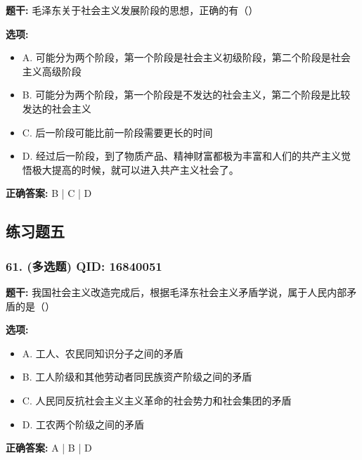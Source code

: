 \documentclass[12pt,UTF8]{ctexart}
\begin{document}
\textbf{题干:}
毛泽东关于社会主义发展阶段的思想，正确的有（）

\textbf{选项:}
\begin{itemize}[leftmargin=*]

  \item A. 可能分为两个阶段，第一个阶段是社会主义初级阶段，第二个阶段是社会主义高级阶段

  \item B. 可能分为两个阶段，第一个阶段是不发达的社会主义，第二个阶段是比较发达的社会主义

  \item C. 后一阶段可能比前一阶段需要更长的时间

  \item D. 经过后一阶段，到了物质产品、精神财富都极为丰富和人们的共产主义觉悟极大提高的时候，就可以进入共产主义社会了。

\end{itemize}

\textbf{正确答案:}
B | C | D

\vspace{0.3em}\hrulefill\vspace{0.7em}

\subsection*{练习题五}

\subsubsection*{61. (多选题) \small QID: 16840051}

\textbf{题干:}
我国社会主义改造完成后，根据毛泽东社会主义矛盾学说，属于人民内部矛盾的是（）

\textbf{选项:}
\begin{itemize}[leftmargin=*]

  \item A. 工人、农民同知识分子之间的矛盾

  \item B. 工人阶级和其他劳动者同民族资产阶级之间的矛盾

  \item C. 人民同反抗社会主义主义革命的社会势力和社会集团的矛盾

  \item D. 工农两个阶级之间的矛盾

\end{itemize}

\textbf{正确答案:}
A | B | D
\end{document}
